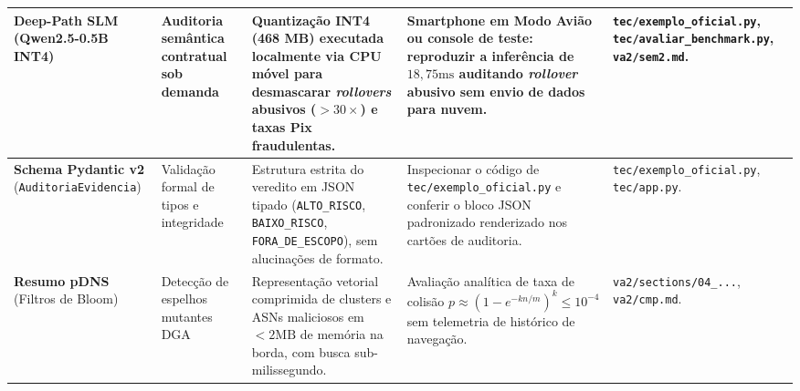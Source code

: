 \begin{table}[!htbp]
\begin{tabular}{p{1.7cm}p{1.6cm}p{2.6cm}p{3.3cm}p{1.9cm}}
\midrule
\textbf{Deep-Path SLM} (Qwen2.5-0.5B INT4)~\cite{liu2024mobilellm} & Auditoria sem\^{a}ntica contratual sob demanda & Quantiza\c{c}\~{a}o INT4 (468 MB) executada localmente via CPU m\'{o}vel para desmascarar \textit{rollovers} abusivos ($>30\times$) e taxas Pix fraudulentas. & Smartphone em Modo Avi\~{a}o ou console de teste: reproduzir a infer\^{e}ncia de $18{,}75\text{ms}$ auditando \textit{rollover} abusivo sem envio de dados para nuvem. & \texttt{tec/exemplo\_oficial.py}, \newline \texttt{tec/avaliar\_benchmark.py}, \newline \texttt{va2/sem2.md}. \\
\midrule
\textbf{Schema Pydantic v2} (\texttt{AuditoriaEvidencia}) & Valida\c{c}\~{a}o formal de tipos e integridade & Estrutura estrita do veredito em JSON tipado (\texttt{ALTO\_RISCO}, \texttt{BAIXO\_RISCO}, \texttt{FORA\_DE\_ESCOPO}), sem alucina\c{c}\~{o}es de formato. & Inspecionar o c\'{o}digo de \texttt{tec/exemplo\_oficial.py} e conferir o bloco JSON padronizado renderizado nos cart\~{o}es de auditoria. & \texttt{tec/exemplo\_oficial.py}, \newline \texttt{tec/app.py}. \\
\midrule
\textbf{Resumo pDNS} (Filtros de Bloom)~\cite{nabeel2020following} & Detec\c{c}\~{a}o de espelhos mutantes DGA & Representa\c{c}\~{a}o vetorial comprimida de clusters e ASNs maliciosos em $< 2\text{MB}$ de mem\'{o}ria na borda, com busca sub-milissegundo. & Avalia\c{c}\~{a}o anal\'{i}tica de taxa de colis\~{a}o $p \approx (1 - e^{-kn/m})^k \le 10^{-4}$ sem telemetria de hist\'{o}rico de navega\c{c}\~{a}o. & \texttt{va2/sections/04\_...}, \newline \texttt{va2/cmp.md}. \\
\bottomrule
\end{tabular}
\end{table}

\clearpage
